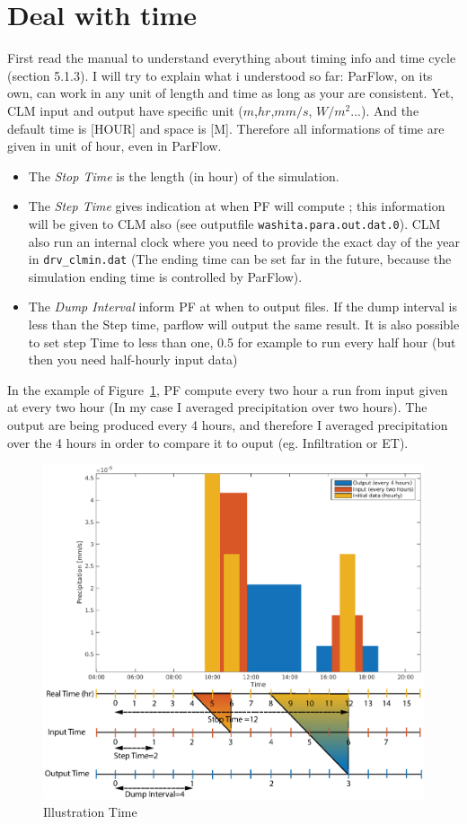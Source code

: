 \documentclass[11pt,a4paper]{report}
\begin{document}
\section{Deal with time}
\label{sec:dealtime}
First read the manual to understand everything about timing info and time cycle (section 5.1.3). I will try to explain what i understood so far: ParFlow, on its own, can work in any unit of length and time as long as your are consistent. Yet, CLM input and output have specific unit ($m$,$hr$,$mm/s$, $W/m^2$...). And the default time is [HOUR] and space is [M]. Therefore all informations of time are given in unit of hour, even in ParFlow.
\begin{itemize}
\item The \emph{Stop Time} is the length (in hour) of the simulation. 
\item The \emph{Step Time} gives indication at when PF will compute ; this information will be given to CLM also (see outputfile \verb$washita.para.out.dat.0$). CLM also run an internal clock where you need to provide the exact day of the year in \verb$drv_clmin.dat$ (The ending time can be set far in the future, because the simulation ending time is controlled by ParFlow). 
\item The \emph{Dump Interval} inform PF at when to output files. If the dump interval is less than the Step time, parflow will output the same result. It is also possible to set step Time to less than one, 0.5 for example to run every half hour (but then you need half-hourly input data)
\end{itemize}

In the example of Figure~\ref{fig:timeexplanation}, PF compute every two hour a run from input given at every two hour (In my case I averaged precipitation over two hours). The output are being produced every 4 hours, and therefore I averaged precipitation over the 4 hours in order to compare it to ouput (eg. Infiltration or ET).

\begin{figure}[hbtp]
\caption{Illustration Time}
\label{fig:timeexplanation}
\centering
\includegraphics[width=\textwidth]{timeexplaination.eps}
\end{figure}
\end{document}
